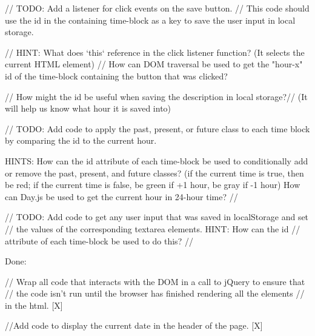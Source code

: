 // TODO: Add a listener for click events on the save button.
  // This code should use the id in the containing time-block as a key to save the user input in local storage.

  // HINT: What does `this` reference in the click listener function? (It selects the current HTML element)
  // How can DOM traversal be used to get the "hour-x" id of the time-block containing the button that was clicked?


  // How might the id be useful when saving the description in local storage?// (It will help us know what hour it is saved into)

  // TODO: Add code to apply the past, present, or future class to each time block by comparing the id to the current hour. 
  
  HINTS: How can the id attribute of each time-block be used to conditionally add or remove the past, present, and future classes? 
  (if the current time is true, then be red; if the current time is false, be green if +1 hour, be gray if -1 hour)
  How can Day.js be used to get the current hour in 24-hour time?
  //


  // TODO: Add code to get any user input that was saved in localStorage and set
  // the values of the corresponding textarea elements. HINT: How can the id
  // attribute of each time-block be used to do this?
  //





Done: 

// Wrap all code that interacts with the DOM in a call to jQuery to ensure that
// the code isn't run until the browser has finished rendering all the elements
// in the html. [X]

//Add code to display the current date in the header of the page. [X]

 